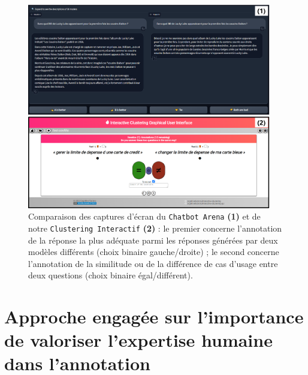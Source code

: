 \begin{leftBarAuthorOpinion}
			\begin{figure}[H]
				\centering
				\includegraphics[width=0.95\textwidth]{figures/chatbot-arena-vs-interactive-clustering}
				\caption{
					Comparaison des captures d'écran du \texttt{Chatbot Arena} \textbf{(1)} et de notre \texttt{Clustering Interactif} \textbf{(2)} :
					le premier concerne l'annotation de la réponse la plus adéquate parmi les réponses générées par deux modèles différents (choix binaire gauche/droite) ;
					le second concerne l'annotation de la similitude ou de la différence de cas d'usage entre deux questions (choix binaire égal/différent). 
				}

				\label{figure:6.2-PERSPECTIVES-CHATBOT-ARENA}
			\end{figure}
		\end{leftBarAuthorOpinion}
		
		
	\section*{Approche engagée sur l'importance de valoriser l'expertise humaine dans l'annotation}
		
